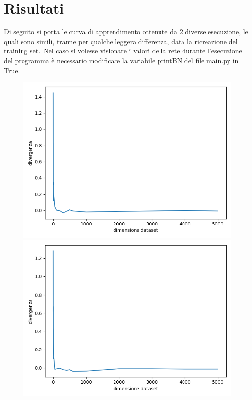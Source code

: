 \documentclass[14pt]{extarticle}
\begin{document}
	\section{Risultati}
	Di seguito si porta le curva di apprendimento ottenute da 2 diverse esecuzione, le quali sono simili, tranne per qualche leggera differenza, data la ricreazione del training set.\
	Nel caso si volesse visionare  i valori della rete durante l'esecuzione del programma è necessario modificare la variabile printBN del file main.py in True.
	\begin{figure}[t]
	\includegraphics[scale=0.8]{Figure_1.png}\\
	\includegraphics[scale=0.8]{Figure_2.png}\\
	\centering
	\end{figure}
	
\end{document}
